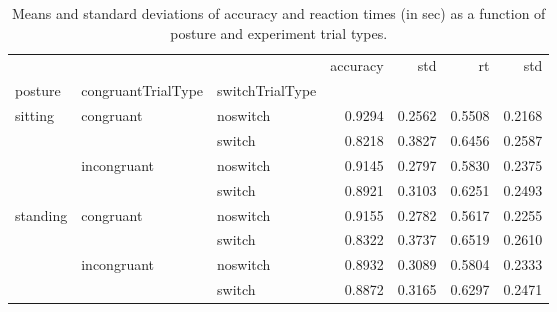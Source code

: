 \begin{table}
\centering
\caption{Means and standard deviations of accuracy and reaction times (in sec) as a function of posture and experiment trial types.}
\label{table-task-switching-replication-reaction-time}
\begin{tabular}{lllrrrr}
\toprule
         &             &        & accuracy &    std &     rt &    std \\
posture & congruantTrialType & switchTrialType &          &        &        &        \\
\midrule
sitting & congruant & noswitch &   0.9294 & 0.2562 & 0.5508 & 0.2168 \\
         &             & switch &   0.8218 & 0.3827 & 0.6456 & 0.2587 \\
         & incongruant & noswitch &   0.9145 & 0.2797 & 0.5830 & 0.2375 \\
         &             & switch &   0.8921 & 0.3103 & 0.6251 & 0.2493 \\
standing & congruant & noswitch &   0.9155 & 0.2782 & 0.5617 & 0.2255 \\
         &             & switch &   0.8322 & 0.3737 & 0.6519 & 0.2610 \\
         & incongruant & noswitch &   0.8932 & 0.3089 & 0.5804 & 0.2333 \\
         &             & switch &   0.8872 & 0.3165 & 0.6297 & 0.2471 \\
\bottomrule
\end{tabular}
\end{table}
